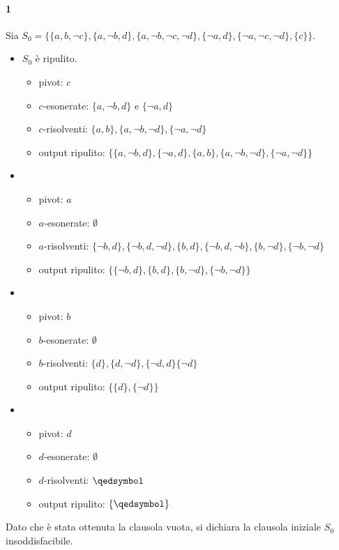 \paragraph{1}
Sia $S_0 = \{\{a,b,\neg c\}, \{a, \neg b, d\}, \{a, \neg b, \neg c, \neg d\}, 
\{\neg a, d\}, \{\neg a, \neg c, \neg d\}, \{c\}\}$. 
\begin{itemize}
  \item $S_0$ è ripulito.
    \begin{itemize}
      \item pivot: $c$
      \item $c$-esonerate: $\{a, \neg b, d\}$ e $\{\neg a, d\}$
      \item $c$-risolventi: $\{a,b\}, \{a, \neg b, \neg d\}, \{\neg a, \neg d\}$
      \item output ripulito: $\{\{a, \neg b, d\}, \{\neg a, d\}, \{a, b\}, \{a, \neg b, \neg d\}, \{\neg a, \neg d\}\}$
    \end{itemize}
  \item
    \begin{itemize}
      \item pivot: $a$
      \item $a$-esonerate: $\emptyset$
      \item $a$-risolventi: $\{\neg b, d\}, \{\neg b, d, \neg d\}, \{b, d\}, \{\neg b, d, \neg b\}, \{b, \neg d\}, \{\neg b, \neg d\}$
      \item output ripulito: $\{\{\neg b, d\}, \{b, d\}, \{b, \neg d\}, \{\neg b, \neg d\}\}$
    \end{itemize}
  \item
    \begin{itemize}
      \item pivot: $b$
      \item $b$-esonerate: $\emptyset$
      \item $b$-risolventi: $\{d\},\{d, \neg d\}, \{\neg d, d\} \{\neg d\}$
      \item output ripulito: $\{\{d\}, \{\neg d\}\}$
    \end{itemize}
  \item 
    \begin{itemize}
      \item pivot: $d$
      \item $d$-esonerate: $\emptyset$
      \item $d$-risolventi: $\qedsymbol$
      \item output ripulito: $\{\qedsymbol\}$
    \end{itemize}
\end{itemize}
Dato che è stata ottenuta la clausola vuota, si dichiara la clausola iniziale $S_0$ insoddisfacibile. 
